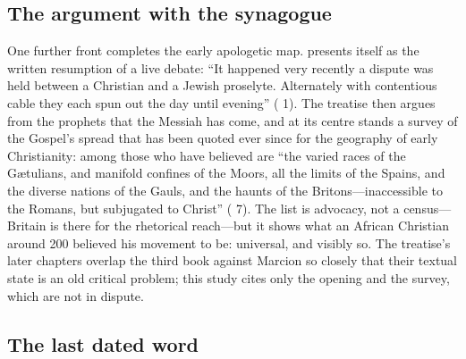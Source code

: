 \subsection{The argument with the synagogue}

One further front completes the early apologetic map.  presents itself as the written resumption of a live debate: ``It
happened very recently a dispute was held between a Christian and a Jewish
proselyte. Alternately with contentious cable they each spun out the day until
evening'' ( 1). The treatise then argues from the
prophets that the Messiah has come, and at its centre stands a survey of the
Gospel's spread that has been quoted ever since for the geography of early
Christianity: among those who have believed are ``the varied races of the
G\ae tulians, and manifold confines of the Moors, all the limits of the
Spains, and the diverse nations of the Gauls, and the haunts of the
Britons---inaccessible to the Romans, but subjugated to Christ'' ( 7). The list is advocacy, not a census---Britain is there
for the rhetorical reach---but it shows what an African Christian around 200
believed his movement to be: universal, and visibly so. The treatise's later
chapters overlap the third book against Marcion so closely that their textual
state is an old critical problem; this study cites only the opening and the
survey, which are not in dispute.

\subsection{The last dated word}

